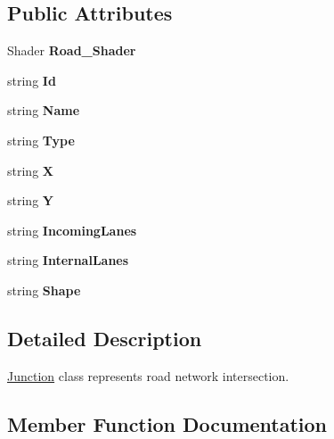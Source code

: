 \subsection*{Public Attributes}
\begin{DoxyCompactItemize}
\item 
\mbox{\label{class_junction_a743d19d85f9339788d583823e1d5560d}} 
Shader {\bfseries Road\+\_\+\+Shader}
\item 
\mbox{\label{class_junction_aafa4fcc8f658991b53226b5d262e9879}} 
string {\bfseries Id}
\item 
\mbox{\label{class_junction_a5d9b7a5a824a2be15cc132b807886c90}} 
string {\bfseries Name}
\item 
\mbox{\label{class_junction_a5f0e7e043c53f34c9e486d2a97102b06}} 
string {\bfseries Type}
\item 
\mbox{\label{class_junction_a1db3486037f1c48bf7e8dfc840554d59}} 
string {\bfseries X}
\item 
\mbox{\label{class_junction_a7261805525d4563e5c476a69ae09ca1e}} 
string {\bfseries Y}
\item 
\mbox{\label{class_junction_ac63e779f04e8ee963533e32bafe3074d}} 
string {\bfseries Incoming\+Lanes}
\item 
\mbox{\label{class_junction_aadf670a8d23f2bd1ac299d8c919b628c}} 
string {\bfseries Internal\+Lanes}
\item 
\mbox{\label{class_junction_a08e99228991573794a51ecde746c165a}} 
string {\bfseries Shape}
\end{DoxyCompactItemize}


\subsection{Detailed Description}
\mbox{\hyperlink{class_junction}{Junction}} class represents road network intersection. 



\subsection{Member Function Documentation}
\mbox{\label{class_junction_a8cff04b2726c9aab876bf0434cf477db}} 
